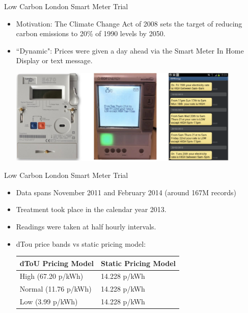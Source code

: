 \documentclass{beamer}
\begin{document}
\begin{frame}{Low Carbon London Smart Meter Trial}
  \begin{itemize}
    \item<+-> Motivation: The Climate Change Act of 2008 sets the target of reducing carbon emissions to 20\% of 1990 levels by 2050.
    \item<+-> ``Dynamic": Prices were given a day ahead via the Smart Meter In Home Display or text message.
    \vspace{0.3cm}
    \begin{center}
    \includegraphics[width=0.87\textwidth]{images/day-ahead-pricing.png}
    \end{center}
  \end{itemize}
\end{frame}

\begin{frame}{Low Carbon London Smart Meter Trial}
  \begin{itemize}
    \item<+-> Data spans November 2011 and February 2014 (around 167M records)
    \item<+-> Treatment took place in the calendar year 2013.
    \item<+-> Readings were taken at half hourly intervals.
    \item<+-> dTou price bands vs static pricing model:
    \begin{table}[]
      \vspace{0.2cm}
      \centering
      \begin{tabular}{|l|l|}
        \hline
        dToU Pricing Model & Static Pricing Model \\ \hline
        High (67.20 p/kWh) & 14.228 p/kWh \\ \hline
        Normal (11.76 p/kWh) & 14.228 p/kWh \\ \hline
        Low (3.99 p/kWh) & 14.228 p/kWh \\ \hline
      \end{tabular}
    \end{table}
  \end{itemize}
\end{frame}
\end{document}
